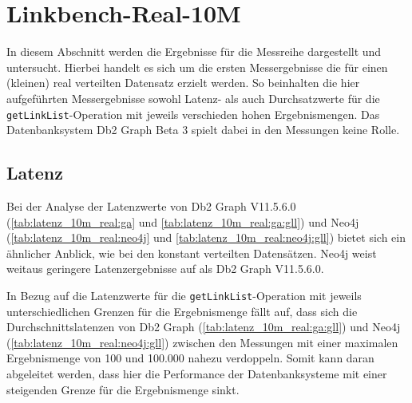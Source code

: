 \section{Linkbench-Real-10M}
\label{ergebnisse:10m_real}
In diesem Abschnitt werden die Ergebnisse für die Messreihe  dargestellt und untersucht. Hierbei handelt es sich um die ersten Messergebnisse die für einen (kleinen) real verteilten Datensatz erzielt werden. So beinhalten die hier aufgeführten Messergebnisse sowohl Latenz- als auch Durchsatzwerte für die \texttt{getLinkList}-Ope\-ra\-ti\-on mit jeweils verschieden hohen Ergebnismengen. Das Datenbanksystem Db2 Graph Beta 3 spielt dabei in den Messungen keine Rolle.

\subsection{Latenz}
Bei der Analyse der Latenzwerte von Db2 Graph V11.5.6.0 (\autoref{tab:latenz_10m_real:ga} und \autoref{tab:latenz_10m_real:ga:gll}) und Neo4j (\autoref{tab:latenz_10m_real:neo4j} und \autoref{tab:latenz_10m_real:neo4j:gll}) bietet sich ein ähnlicher Anblick, wie bei den konstant verteilten Datensätzen. Neo4j weist weitaus geringere Latenzergebnisse auf als Db2 Graph V11.5.6.0. 

In Bezug auf die Latenzwerte für die \texttt{getLinkList}-Ope\-ra\-ti\-on mit jeweils unterschiedlichen Grenzen für die Ergebnismenge fällt auf, dass sich die Durchschnittslatenzen von Db2 Graph (\autoref{tab:latenz_10m_real:ga:gll}) und Neo4j (\autoref{tab:latenz_10m_real:neo4j:gll}) zwischen den Messungen mit einer maximalen Ergebnismenge von 100 und 100.000 nahezu verdoppeln. Somit kann daran abgeleitet werden, dass hier die Performance der Datenbanksysteme mit einer steigenden Grenze für die Ergebnismenge sinkt.

\begin{table}[!ht]
\centering
{}
\caption{Latenz Linkbench-Real-10M Db2 Graph V11.5.6.0}
\label{tab:latenz_10m_real:ga}
\end{table}    


